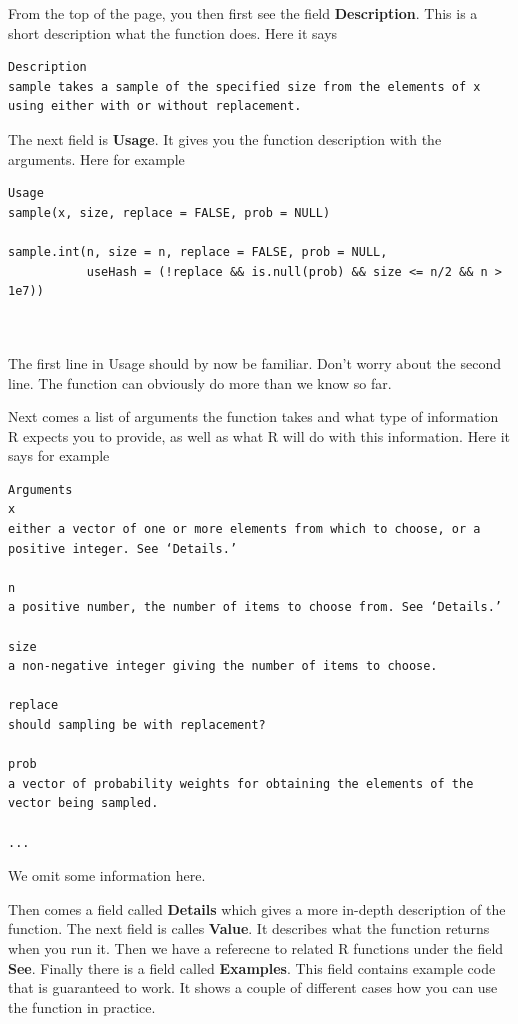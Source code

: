 \documentclass[
]{book}
\begin{document}
From the top of the page, you then first see the field \textbf{Description}. This is a short description what the function does. Here it says

\begin{verbatim}
Description
sample takes a sample of the specified size from the elements of x using either with or without replacement.
\end{verbatim}

The next field is \textbf{Usage}. It gives you the function description with the arguments. Here for example

\begin{verbatim}
Usage
sample(x, size, replace = FALSE, prob = NULL)

sample.int(n, size = n, replace = FALSE, prob = NULL,
           useHash = (!replace && is.null(prob) && size <= n/2 && n > 1e7))
           
           
\end{verbatim}

The first line in Usage should by now be familiar. Don't worry about the second line. The function can
obviously do more than we know so far.

Next comes a list of arguments the function takes and what type of information R
expects you to provide, as well as what R will do with this information. Here it says for example

\begin{verbatim}
Arguments
x   
either a vector of one or more elements from which to choose, or a positive integer. See ‘Details.’

n   
a positive number, the number of items to choose from. See ‘Details.’

size    
a non-negative integer giving the number of items to choose.

replace 
should sampling be with replacement?

prob    
a vector of probability weights for obtaining the elements of the vector being sampled.

...
\end{verbatim}

We omit some information here.

Then comes a field called \textbf{Details} which gives a more in-depth description of the function. The next
field is calles \textbf{Value}. It describes what the function returns when you run it. Then
we have a referecne to related R functions under the field \textbf{See}. Finally there is a field called
\textbf{Examples}. This field contains example code that is guaranteed to work. It shows a
couple of different cases how you can use the function in practice.
\end{document}
